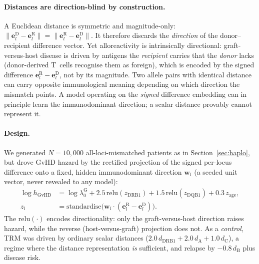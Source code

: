 \documentclass[11pt,a4paper]{article}
\begin{document}
\paragraph{Distances are direction-blind by construction.}
A Euclidean distance is symmetric and magnitude-only:
$\lVert \mathbf{e}^{\mathrm{D}}_l - \mathbf{e}^{\mathrm{R}}_l \rVert =
\lVert \mathbf{e}^{\mathrm{R}}_l - \mathbf{e}^{\mathrm{D}}_l \rVert$.
It therefore discards the \emph{direction} of the donor--recipient difference
vector.  Yet alloreactivity is intrinsically directional: graft-versus-host
disease is driven by antigens the \emph{recipient} carries that the
\emph{donor} lacks (donor-derived T~cells recognise them as foreign), which is
encoded by the signed difference $\mathbf{e}^{\mathrm{R}}_l -
\mathbf{e}^{\mathrm{D}}_l$, not by its magnitude.  Two allele pairs with
identical distance can carry opposite immunological meaning depending on which
direction the mismatch points.  A model operating on the \emph{signed}
difference embedding can in principle learn the immunodominant direction; a
scalar distance provably cannot represent it.

\paragraph{Design.}
We generated $N=10{,}000$ all-loci-mismatched patients as in
Section~\ref{sec:haplo}, but drove GvHD hazard by the rectified projection of
the signed per-locus difference onto a fixed, hidden immunodominant direction
$\mathbf{w}_l$ (a seeded unit vector, never revealed to any model):
\begin{align}
\log h_{\mathrm{GvHD}} &= \log\lambda_0^{\mathrm{G}}
    + 2.5\,\mathrm{relu}(z_{\mathrm{DRB1}})
    + 1.5\,\mathrm{relu}(z_{\mathrm{DQB1}})
    + 0.3\,z_{\mathrm{age}}, \\
z_l &= \mathrm{standardise}\big(\mathbf{w}_l \cdot
       (\mathbf{e}^{\mathrm{R}}_l - \mathbf{e}^{\mathrm{D}}_l)\big).
\end{align}
The $\mathrm{relu}(\cdot)$ encodes directionality: only the graft-versus-host
direction raises hazard, while the reverse (host-versus-graft) projection does
not.  As a \emph{control}, TRM was driven by ordinary scalar distances
($2.0\,d_{\mathrm{DRB1}} + 2.0\,d_{\mathrm{A}} + 1.0\,d_{\mathrm{C}}$), a regime
where the distance representation \emph{is} sufficient, and relapse by
$-0.8\,d_{\mathrm{B}}$ plus disease risk.
\end{document}
